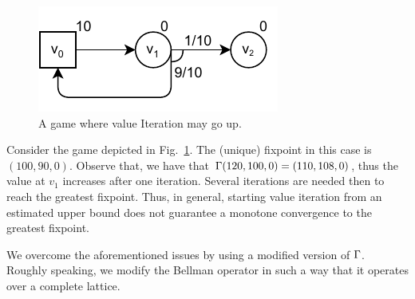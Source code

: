 \begin{figure}
\vspace{-6ex}
\centering
\includegraphics[scale=0.6]{Figs/overflow-horiz.pdf}\hspace{-2ex}
\caption{A game where value Iteration may go up.} \label{fig:overflow}
\end{figure}
\begin{example}\label{ex:overflow}  Consider the game depicted in Fig.~\ref{fig:overflow}.
The (unique) fixpoint in this case is $(100,90,0)$. Observe that,  we have that $\Gamma(120,100,0) = (110, 108, 0)$, thus the value at $v_1$ increases after one iteration. Several iterations are needed then to reach the greatest fixpoint.  Thus, in general, starting value iteration from an estimated upper bound does not guarantee  a monotone convergence to the greatest fixpoint.
\end{example}

    We overcome the aforementioned  issues by using a modified version of $\Gamma$. Roughly speaking, we  modify the Bellman operator in such a way that it operates over a complete lattice. 

